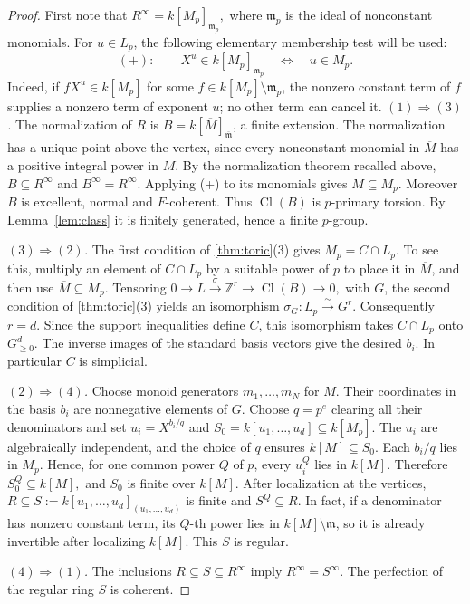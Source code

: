 \documentclass[11pt,a4paper]{amsart}
\numberwithin{equation}{section}
\newcommand{\Cl}{\operatorname{Cl}}
\newcommand{\ZZ}{\mathbb Z}
\begin{document}
 \begin{proof}	First note that
$	R^\infty=k[M_p]_{\mathfrak m_p},$	where $\mathfrak m_p$ is the ideal of nonconstant monomials.	For $u\in L_p$, the following elementary membership test will be used:
 	$$
(+):\quad \quad 	X^u\in k[M_p]_{\mathfrak m_p}\quad\Longleftrightarrow\quad u\in M_p.	$$	Indeed, if $fX^u\in k[M_p]$ for some 	$f\in k[M_p]\setminus\mathfrak m_p$, the nonzero constant term 	of $f$ supplies a nonzero term of exponent $u$; no other term 	can cancel it.
 	 	\medskip\noindent
 	\emph{$(1)\Rightarrow(3)$.}
 	The normalization of $R$ is
$B=k[\overline M]_{\overline{\mathfrak m}}$, a finite extension.
The normalization has a unique point above the vertex, since every 	nonconstant monomial in $\overline M$ has a positive integral power 	in $M$. 	By the normalization theorem recalled above,
$B\subseteq R^\infty$ and $B^\infty=R^\infty$.	Applying (+) to its monomials gives $\overline M\subseteq M_p$.
 Moreover $B$ is excellent, normal and $F$-coherent. Thus
$\Cl(B)$ is $p$-primary torsion. 	By Lemma~\ref{lem:class} it is finitely generated, hence a finite
 	$p$-group.
 	
 	\medskip\noindent
 	\emph{$(3)\Rightarrow(2)$.}
 	The first condition of \ref{thm:toric}(3) gives
 $	M_p=C\cap L_p. $	To see this, multiply an element of $C\cap L_p$ by a suitable	power of $p$ to place it in $\overline M$, and then use	$\overline M\subseteq M_p$.
Tensoring $	0\longrightarrow L
\xrightarrow{\ \sigma\ }\ZZ^r
 \longrightarrow\Cl(B)\longrightarrow0,$ with $G$, the second condition of \ref{thm:toric}(3) yields
 an isomorphism
 $	\sigma_G:L_p\xrightarrow{\ \sim\ }G^r.$	Consequently $r=d$. Since the support inequalities define $C$,	this isomorphism takes $C\cap L_p$ onto $G_{\geq0}^d$.	The inverse images of the standard basis vectors give the desired	$b_i$. In particular $C$ is simplicial.
 	
 	\medskip\noindent
 \emph{$(2)\Rightarrow(4)$.}
 Choose monoid generators $m_1,\ldots,m_N$ for $M$.
 Their coordinates in the basis $b_i$ are nonnegative elements
 of $G$. Choose $q=p^e$ clearing all their denominators and set
 $	u_i=X^{b_i/q}$ and
 $S_0=k[u_1,\ldots,u_d]\subseteq k[M_p].$
 The $u_i$ are algebraically independent, and the choice of $q$	ensures $k[M]\subseteq S_0$.
 Each $b_i/q$ lies in $M_p$. Hence, for one common power $Q$
 of $p$, every $u_i^Q$ lies in $k[M]$. Therefore
 $S_0^Q\subseteq k[M], $
 and $S_0$ is finite over $k[M]$.	After localization at the vertices,
 $R\subseteq S:=k[u_1,\ldots,u_d]_{(u_1,\ldots,u_d)}$	is finite and $S^Q\subseteq R$. In fact, if a denominator has	nonzero constant term, its $Q$-th power lies in	$k[M]\setminus\mathfrak m$, so it is already invertible after	localizing $k[M]$.	This $S$ is regular.
 	
 \medskip\noindent
 \emph{$(4)\Rightarrow(1)$.}
 The inclusions $R\subseteq S\subseteq R^\infty$ imply
 $R^\infty=S^\infty$. The perfection of the regular ring $S$ is
 coherent.
 \end{proof}
 
\end{document}
